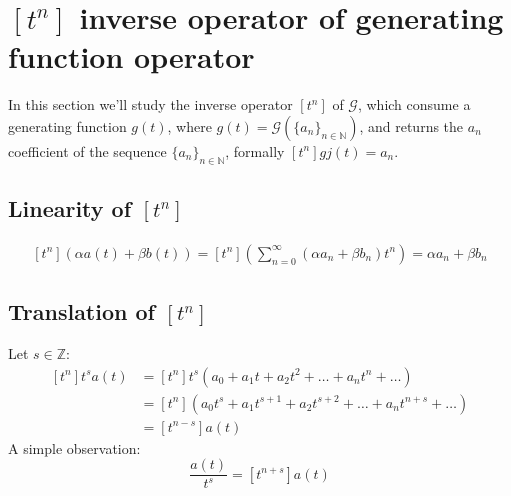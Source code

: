 
\section{ $[t^{n}] $ inverse operator of generating function operator}

In this section we'll study the inverse operator $[t^{n}] $ of
$\mathcal{G} $, which consume a generating function $g(t)$, where
$g(t) = \mathcal{G} (\{a_n\}_{n\in\mathbb{N} } )$, and returns the
$a_n$ coefficient of the sequence $\{a_n\}_{n\in\mathbb{N} }$,
formally $[t^{n}] gj(t) = a_n$.

\subsection{Linearity of $[t^{n}] $}
\begin{displaymath}
  \begin{split}
    [t^{n}] (\alpha a(t) + \beta b(t)) = [t^{n}]
    \left(\sum_{n=0}^{\infty}{(\alpha a_n + \beta b_n )t^n}\right) =
    \alpha a_n + \beta b_n
  \end{split}
\end{displaymath}

\subsection{Translation of $[t^{n}] $}
Let $s\in \mathbb{Z}$:
\begin{displaymath}
  \begin{split}
    [t^{n}] t^s a(t) &= [t^{n}] t^s (a_0 + a_1 t + a_2 t^2 + \ldots +
    a_n t^n + \ldots )\\
    &= [t^{n}] (a_0 t^s + a_1 t^{s+1} + a_2 t^{s+2} + \ldots + a_n
    t^{n+s} + \ldots )\\
    &= [t^{n-s}] a(t)
  \end{split}
\end{displaymath}
A simple observation:
\begin{displaymath}
  [t^{n}]  \frac{  a(t)}{t^s} = [t^{n+s}] a(t)
\end{displaymath}

